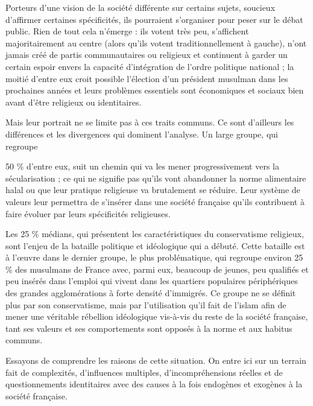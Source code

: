 Porteurs d'une vision de la société différente sur certains sujets,
soucieux d'affirmer certaines spécificités, ils pourraient s'organiser
pour peser sur le débat public. Rien de tout cela n'émerge : ils votent
très peu, s'affichent majoritairement au centre (alors qu'ils votent
traditionnellement à gauche), n'ont jamais créé de partis communautaires
ou religieux et continuent à garder un certain espoir envers la capacité
d'intégration de l'ordre politique national ; la moitié d'entre eux
croit possible l'élection d'un président musulman dans les prochaines
années et leurs problèmes essentiels sont économiques et sociaux bien
avant d'être religieux ou identitaires.

Mais leur portrait ne se limite pas à ces traits communs. Ce sont
d'ailleurs les différences et les divergences qui dominent l'analyse. Un
large groupe, qui regroupe

50 \% d'entre eux, suit un chemin qui va les mener progressivement vers
la sécularisation ; ce qui ne signifie pas qu'ils vont abandonner la
norme alimentaire halal ou que leur pratique religieuse va brutalement se réduire. Leur
système de valeurs leur permettra de s'insérer dans une société
française qu'ils contribuent à faire évoluer par leurs spécificités
religieuses.

Les 25 \% médians, qui présentent les caractéristiques du conservatisme
religieux, sont l'enjeu de la bataille politique et idéologique qui a
débuté. Cette bataille est à l'œuvre dans le dernier groupe, le plus
problématique, qui regroupe environ 25 \% des musulmans de France avec,
parmi eux, beaucoup de jeunes, peu qualifiés et peu insérés dans
l'emploi qui vivent dans les quartiers populaires périphériques des
grandes agglomérations à forte densité d'immigrés. Ce groupe ne se
définit plus par son conservatisme, mais par l'utilisation qu'il fait de
l'islam afin de mener une véritable rébellion idéologique vis-à-vis du
reste de la société française, tant ses valeurs et ses comportements
sont opposés à la norme et aux habitus communs.

Essayons de comprendre les raisons de cette situation. On entre ici sur
un terrain fait de complexités, d'influences multiples,
d'incompréhensions réelles et de questionnements identitaires avec des
causes à la fois endogènes et exogènes à la société française.

